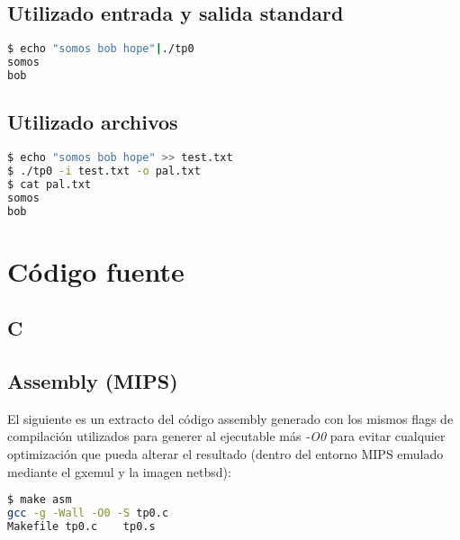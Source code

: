 \documentclass[10pt,a4paper]{article}
\begin{document}
\subsection{Utilizado entrada y salida standard}

\begin{lstlisting}[language=bash]
$ echo "somos bob hope"|./tp0 
somos
bob
\end{lstlisting}

\subsection{Utilizado archivos}

\begin{lstlisting}[language=bash]
$ echo "somos bob hope" >> test.txt
$ ./tp0 -i test.txt -o pal.txt
$ cat pal.txt 
somos
bob
\end{lstlisting}

\newpage

\section{Código fuente}

\subsection{C}

\lstset{
	breaklines=true,
  	basicstyle=\footnotesize,
	numbers=left,
	captionpos=b,
	showspaces=false,
	title=\lstname
}



\newpage

\subsection{Assembly (MIPS)}

El siguiente es un extracto del código assembly generado con los mismos flags de compilación utilizados para generer al ejecutable más \textit{-O0} para evitar cualquier optimización que pueda alterar el resultado (dentro del entorno MIPS emulado mediante el gxemul y la imagen netbsd):

\lstset{
	breaklines=true,
  	basicstyle=\footnotesize,
}

\begin{lstlisting}[language=bash]
$ make asm
gcc -g -Wall -O0 -S tp0.c
Makefile tp0.c    tp0.s
\end{lstlisting}
\end{document}
